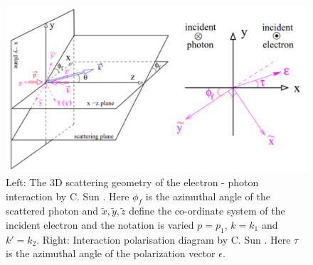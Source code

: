 \documentclass[../main.tex]{subfiles}
\begin{document}
\begin{figure}[!h]
\centering
\includegraphics[width=\textwidth]{Figures/Theory_of_Photon_Production_by_Inverse_Compton_Scattering/SunPolarisationScatteringDiagram.pdf}
\caption{Left: The 3D scattering geometry of the electron - photon interaction by C. Sun \cite{sun2009characterizations}. Here $\phi_{f}$ is the azimuthal angle of the scattered photon and $\tilde{x}, \tilde{y}, \tilde{z}$ define the co-ordinate system of the incident electron and the notation is varied $p = p_{1}$, $k = k_{1}$ and $k' = k_{2}$. Right: Interaction polarisation diagram by C. Sun \cite{sun2009characterizations}. Here $\tau$ is the azimuthal angle of the polarization vector $\epsilon$.}
\label{fig:sun_geometry}
\end{figure}
\end{document}
